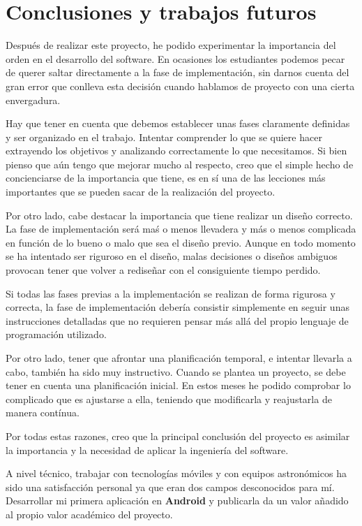 \chapter{Conclusiones y trabajos futuros}

Después de realizar este proyecto, he podido experimentar la importancia del orden en el desarrollo del software. En ocasiones los estudiantes podemos pecar de querer saltar directamente a la fase de implementación, sin darnos cuenta del gran error que conlleva esta decisión cuando hablamos de proyecto con una cierta envergadura.

\bigskip
Hay que tener en cuenta que debemos establecer unas fases claramente definidas y ser organizado en el trabajo. Intentar comprender lo que se quiere hacer extrayendo los objetivos y analizando correctamente lo que necesitamos. Si bien pienso que aún tengo que mejorar mucho al respecto, creo que el simple hecho de concienciarse de la importancia que tiene, es en sí una de las lecciones más importantes que se pueden sacar de la realización del proyecto.

\bigskip
Por otro lado, cabe destacar la importancia que tiene realizar un diseño correcto. La fase de implementación será maś o menos llevadera y más o menos complicada en función de lo bueno o malo que sea el diseño previo. Aunque en todo momento se ha intentado ser riguroso en el diseño, malas decisiones o diseños ambiguos provocan tener que volver a rediseñar con el consiguiente tiempo perdido.

\bigskip
Si todas las fases previas a la implementación se realizan de forma rigurosa y correcta, la fase de implementación debería consistir simplemente en seguir unas instrucciones detalladas que no requieren pensar más allá del propio lenguaje de programación utilizado.

\bigskip
Por otro lado, tener que afrontar una planificación temporal, e intentar llevarla a cabo, también ha sido muy instructivo. Cuando se plantea un proyecto, se debe tener en cuenta una planificación inicial. En estos meses he podido comprobar lo complicado que es ajustarse a ella, teniendo que modificarla y reajustarla de manera contínua.


\bigskip
Por todas estas razones, creo que la principal conclusión del proyecto es asimilar la importancia y la necesidad de aplicar la ingeniería del software.

\bigskip
A nivel técnico, trabajar con tecnologías móviles y con equipos astronómicos ha sido una satisfacción personal ya que eran dos campos desconocidos para mí. Desarrollar mi primera aplicación en \textbf{Android} y publicarla da un valor añadido al propio valor académico del proyecto.

